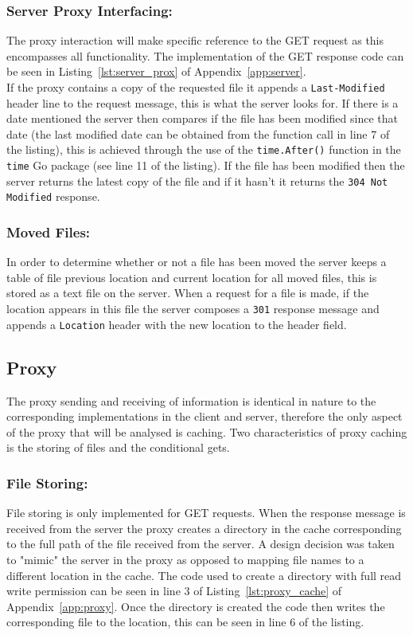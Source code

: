 \documentclass[10pt,twocolumn]{witseiepaper}
\begin{document}
		\subsubsection*{Server Proxy Interfacing:} The proxy interaction will make specific reference to the GET request as this encompasses all functionality. The implementation of the GET response code can be seen in Listing~\ref{lst:server_prox} of Appendix~\ref{app:server}. \\
		
		If the proxy contains a copy of the requested file it appends a \texttt{Last-Modified} header line to the request message, this is what the server looks for. If there is a date mentioned the server then compares if the file has been modified since that date (the last modified date can be obtained from the function call in line 7 of the listing), this is achieved through the use of the \texttt{time.After()} function in the \texttt{time} Go package (see line 11 of the listing). If the file has been modified then the server returns the latest copy of the file and if it hasn't it returns the \texttt{304 Not Modified} response. \\
		
		\subsubsection*{Moved Files:} In order to determine whether or not a file has been moved the server keeps a table of file previous location and current location for all moved files, this is stored as a text file on the server. When a request for a file is made, if the location appears in this file the server composes a \texttt{301} response message and appends a \texttt{Location} header with the new location to the header field.
		
	\subsection{Proxy}
		
		The proxy sending and receiving of information is identical in nature to the corresponding implementations in the client and server, therefore the only aspect of the proxy that will be analysed is caching. Two characteristics of proxy caching is the storing of files and the conditional gets. \\
		
		\subsubsection*{File Storing:} File storing is only implemented for GET requests. When the response message is received from the server the proxy creates a directory in the cache corresponding to the full path of the file received from the server. A design decision was taken to "mimic" the server in the proxy as opposed to mapping file names to a different location in the cache. The code used to create a directory with full read write permission can be seen in line 3 of Listing~\ref{lst:proxy_cache} of Appendix~\ref{app:proxy}. Once the directory is created the code then writes the corresponding file to the location, this can be seen in line 6 of the listing.
		
\end{document}
